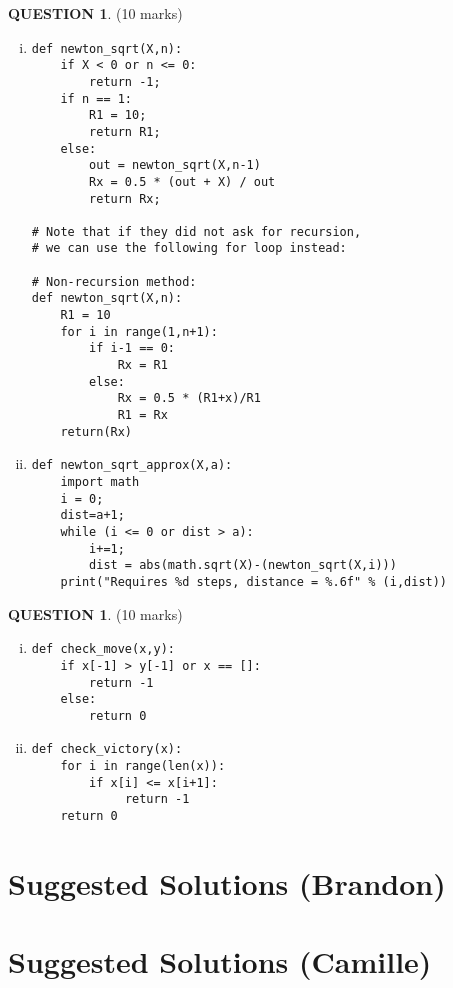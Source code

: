 \documentclass[a4paper,12pt]{article}
\theoremstyle{definition}
\newtheorem{ques}[dummy]{QUESTION}
\theoremstyle{plain}
\newcommand{\py}{python}
\begin{document}
\begin{ques}\hfill (10 marks)\vspace*{1em}\\
	\begin{enumerate}[(i)]
		\item
		\begin{verbatim}
def newton_sqrt(X,n):
    if X < 0 or n <= 0:
        return -1;
    if n == 1:
        R1 = 10;
        return R1;
    else:
        out = newton_sqrt(X,n-1)
        Rx = 0.5 * (out + X) / out
        return Rx;		

# Note that if they did not ask for recursion,
# we can use the following for loop instead:

# Non-recursion method:
def newton_sqrt(X,n):
    R1 = 10
    for i in range(1,n+1):
        if i-1 == 0:
            Rx = R1
        else:
            Rx = 0.5 * (R1+x)/R1
            R1 = Rx
    return(Rx)
\end{verbatim}
\item
		\begin{verbatim}
def newton_sqrt_approx(X,a):
    import math
    i = 0;
    dist=a+1;
    while (i <= 0 or dist > a):
        i+=1;
        dist = abs(math.sqrt(X)-(newton_sqrt(X,i)))
    print("Requires %d steps, distance = %.6f" % (i,dist))
		\end{verbatim}
	\end{enumerate}
\end{ques}




\begin{ques}\hfill (10 marks)\vspace*{1em}\\
	\begin{enumerate}[(i)]
\item
\begin{verbatim}
def check_move(x,y):
    if x[-1] > y[-1] or x == []:
        return -1
    else:
        return 0
        \end{verbatim}
        \item 
        \begin{verbatim}
def check_victory(x):
    for i in range(len(x)):
        if x[i] <= x[i+1]:
             return -1
    return 0
    \end{verbatim}
	\end{enumerate}
\end{ques}


	
	\newpage
	\section*{Suggested Solutions (Brandon)}
	\newpage
	\section*{Suggested Solutions (Camille)}
\end{document}
